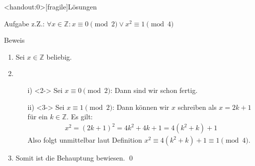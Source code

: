 {
\begin{frame}<handout:0>[fragile]{Lösungen}
	\begin{alertblock}{Aufgabe}
		z.Z.: $\forall x \in \mathbb{Z}: x \equiv 0 \pmod{2} \vee x^2 \equiv 1 \pmod{4}$
	\end{alertblock}
	\begin{alertblock}{Beweis}
		\begin{enumerate}
			\item<1-> Sei $x \in \mathbb{Z}$ beliebig.
			\item<2->
			      \begin{enumerate}
				      \item[i)]<2-> Sei $x \equiv 0 \pmod{2}$: Dann sind wir schon fertig.
				      \item[ii)]<3-> Sei $x \equiv 1 \pmod{2}$: Dann können wir $x$ schreiben als $x = 2k + 1$ für ein $k \in \mathbb{Z}$.
				            Es gilt:
				            \begin{align*}
					            x^2 = (2k+1)^2 = 4k^2 + 4k + 1 = 4(k^2 + k) + 1
				            \end{align*}
				            Also folgt unmittelbar laut Definition $x^2 \equiv 4(k^2 + k) + 1 \equiv 1 \pmod{4}$.
			      \end{enumerate}
			\item<4-> Somit ist die Behauptung bewiesen. \qed
		\end{enumerate}
	\end{alertblock}
\end{frame}
}